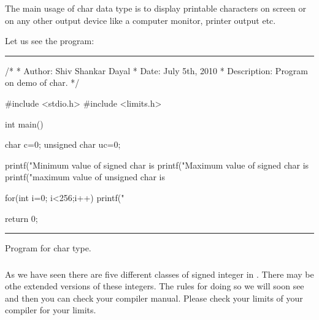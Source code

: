The main usage of char data type is to display printable characters on screen or
on any other output device like a computer monitor, printer output etc.

Let us see the program:
\blank[force,1mm]\hrule\blank[force,1mm]
\startCPP
/*
 * Author: Shiv Shankar Dayal
 * Date: July 5th, 2010
 * Description: Program on demo of char.
 */

#include <stdio.h>
#include <limits.h>

int main()
{
  char c={0};
  unsigned char uc={0};

  printf("Minimum value of signed char is %
  printf("Maximum value of signed char is %
  printf("maximum value of unsigned char is %

  for(int i=0; i<256;i++)
    {
      printf("%
    }

  return 0;
}
\stopCPP
{}
\hrule
\blank[force,1mm]
\startalignment[middle]
Program for char type.
\stopalignment

\subsubsection{}
As we have seen there are five different classes of signed integer in 
. There may be othe extended versions of these
integers. The rules for doing so we will soon see and then you can check your
compiler manual. Please check your limits of your compiler for your limits.
